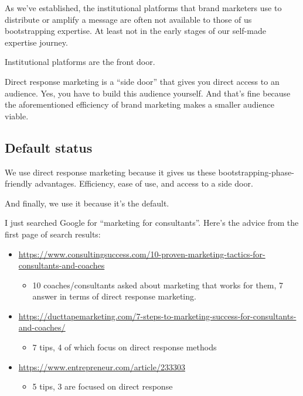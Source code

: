 \documentclass[13pt,]{tufte-handout}
\providecommand{\tightlist}{%
  \setlength{\itemsep}{0pt}\setlength{\parskip}{0pt}}
\begin{document}
As we've established, the institutional platforms that brand marketers
use to distribute or amplify a message are often not available to those
of us bootstrapping expertise. At least not in the early stages of our
self-made expertise journey.

Institutional platforms are the front door.

Direct response marketing is a ``side door'' that gives you direct
access to an audience. Yes, you have to build this audience yourself.
And that's fine because the aforementioned efficiency of brand marketing
makes a smaller audience viable.

\hypertarget{default-status}{%
\subsection{Default status}\label{default-status}}

We use direct response marketing because it gives us these
bootstrapping-phase-friendly advantages. Efficiency, ease of use, and
access to a side door.

And finally, we use it because it's the default.

I just searched Google for ``marketing for consultants''. Here's the
advice from the first page of search results:

\begin{itemize}
\tightlist
\item
  \url{https://www.consultingsuccess.com/10-proven-marketing-tactics-for-consultants-and-coaches}

  \begin{itemize}
  \tightlist
  \item
    10 coaches/consultants asked about marketing that works for them, 7
    answer in terms of direct response marketing.
  \end{itemize}
\item
  \url{https://ducttapemarketing.com/7-steps-to-marketing-success-for-consultants-and-coaches/}

  \begin{itemize}
  \tightlist
  \item
    7 tips, 4 of which focus on direct response methods
  \end{itemize}
\item
  \url{https://www.entrepreneur.com/article/233303}

  \begin{itemize}
  \tightlist
  \item
    5 tips, 3 are focused on direct response
  \end{itemize}
\end{itemize}
\end{document}
